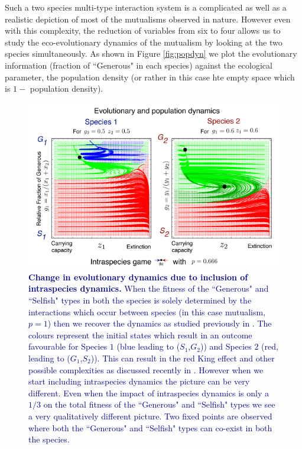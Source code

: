 \documentclass{pnastwo}
\newcommand{\cha}[1]{\textcolor{darkblue}{#1}}
\begin{document}
\begin{article}
Such a two species multi-type interaction system is a complicated as well as a realistic depiction of most of the mutualisms observed in nature.
However even with this complexity, the reduction of variables from six to four allows us to study the eco-evolutionary dynamics of the mutualism by looking at the two species simultaneously.
As shown in Figure \ref{fig:popdyn} we plot the evolutionary information (fraction of ``Generous" in each species) against the ecological parameter, the population density (or rather in this case hte empty space which is $1-$ population density).

\begin{figure}[h]
\begin{center}
\includegraphics[width=2\columnwidth]{../Figures/mainexamplepopdyn2.pdf}
\caption{
\cha{\textbf{Change in evolutionary dynamics due to inclusion of intraspecies dynamics.} When the fitness of the ``Generous" and ``Selfish" types in both the species is solely determined by the interactions which occur between species (in this case mutualism, $p=1$) then we recover the dynamics as studied previously in \cite{gokhale:PRSB:2012}. The colours represent the initial states which result in an outcome favourable for Species $1$ (blue leading to ($S_1$,$G_2$)) and Species $2$ (red, leading to ($G_1$,$S_2$)). This can result in the red King effect and other possible complexities as discussed recently in \cite{gao:SciRep:2015}. However when we start including intraspecies dynamics the picture can be very different.
Even when the impact of intraspecies dynamics is only a $1/3$ on the total fitness of the ``Generous" and ``Selfish" types we see a very qualitatively different picture.
Two fixed points are observed where both the ``Generous" and ``Selfish" types can co-exist in both the species.
}}
\end{center}
\end{figure}
\end{article}
\end{document}
